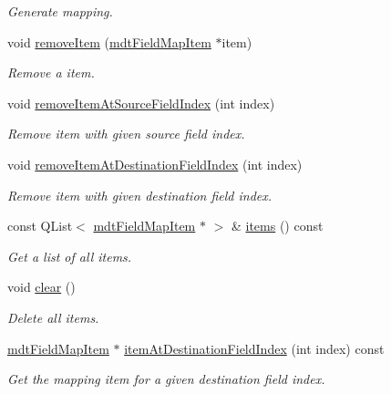 \begin{DoxyCompactItemize}
\begin{DoxyCompactList}\small\item\em Generate mapping. \end{DoxyCompactList}\item 
void \hyperlink{classmdt_field_map_a3a84daf167cac6cd0c5fdd9778562e73}{remove\-Item} (\hyperlink{classmdt_field_map_item}{mdt\-Field\-Map\-Item} $\ast$item)
\begin{DoxyCompactList}\small\item\em Remove a item. \end{DoxyCompactList}\item 
void \hyperlink{classmdt_field_map_a4207bf588bd5e69d3f771aa2048ad3dc}{remove\-Item\-At\-Source\-Field\-Index} (int index)
\begin{DoxyCompactList}\small\item\em Remove item with given source field index. \end{DoxyCompactList}\item 
void \hyperlink{classmdt_field_map_a09eb97d391bad004d5812b2030420aed}{remove\-Item\-At\-Destination\-Field\-Index} (int index)
\begin{DoxyCompactList}\small\item\em Remove item with given destination field index. \end{DoxyCompactList}\item 
const Q\-List$<$ \hyperlink{classmdt_field_map_item}{mdt\-Field\-Map\-Item} $\ast$ $>$ \& \hyperlink{classmdt_field_map_a45807e5ef0aee1a46bb587b5fc9e4504}{items} () const 
\begin{DoxyCompactList}\small\item\em Get a list of all items. \end{DoxyCompactList}\item 
void \hyperlink{classmdt_field_map_ac7b6c8d9467614a9b9f72c5a504f74fe}{clear} ()
\begin{DoxyCompactList}\small\item\em Delete all items. \end{DoxyCompactList}\item 
\hyperlink{classmdt_field_map_item}{mdt\-Field\-Map\-Item} $\ast$ \hyperlink{classmdt_field_map_a64dceefe9255c27db01c2a9f72024725}{item\-At\-Destination\-Field\-Index} (int index) const 
\begin{DoxyCompactList}\small\item\em Get the mapping item for a given destination field index. \end{DoxyCompactList}\item 

\end{DoxyCompactItemize}
